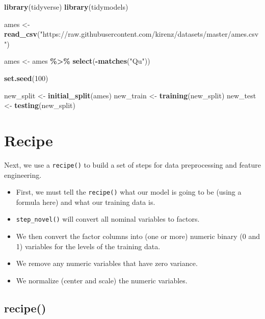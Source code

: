 \documentclass[
]{book}
\newenvironment{Shaded}{\begin{snugshade}}{\end{snugshade}}
\newcommand{\DecValTok}[1]{\textcolor[rgb]{0.00,0.00,0.81}{#1}}
\newcommand{\KeywordTok}[1]{\textcolor[rgb]{0.13,0.29,0.53}{\textbf{#1}}}
\newcommand{\NormalTok}[1]{#1}
\newcommand{\OperatorTok}[1]{\textcolor[rgb]{0.81,0.36,0.00}{\textbf{#1}}}
\newcommand{\StringTok}[1]{\textcolor[rgb]{0.31,0.60,0.02}{#1}}
\providecommand{\tightlist}{%
  \setlength{\itemsep}{0pt}\setlength{\parskip}{0pt}}
\begin{document}
\begin{Shaded}
\begin{Highlighting}[]
\KeywordTok{library}\NormalTok{(tidyverse)}
\KeywordTok{library}\NormalTok{(tidymodels)}

\NormalTok{ames \textless{}{-}}\StringTok{ }\KeywordTok{read\_csv}\NormalTok{(}\StringTok{"https://raw.githubusercontent.com/kirenz/datasets/master/ames.csv"}\NormalTok{)}

\NormalTok{ames \textless{}{-}}\StringTok{ }\NormalTok{ames }\OperatorTok{\%\textgreater{}\%}
\StringTok{  }\KeywordTok{select}\NormalTok{(}\OperatorTok{{-}}\KeywordTok{matches}\NormalTok{(}\StringTok{"Qu"}\NormalTok{))}

\KeywordTok{set.seed}\NormalTok{(}\DecValTok{100}\NormalTok{)}

\NormalTok{new\_split \textless{}{-}}\StringTok{ }\KeywordTok{initial\_split}\NormalTok{(ames)}
\NormalTok{new\_train \textless{}{-}}\StringTok{ }\KeywordTok{training}\NormalTok{(new\_split)}
\NormalTok{new\_test \textless{}{-}}\StringTok{ }\KeywordTok{testing}\NormalTok{(new\_split)}
\end{Highlighting}
\end{Shaded}

\hypertarget{recipe}{%
\chapter{Recipe}\label{recipe}}

Next, we use a \texttt{recipe()} to build a set of steps for data preprocessing and feature engineering.

\begin{itemize}
\tightlist
\item
  First, we must tell the \texttt{recipe()} what our model is going to be (using a formula here) and what our training data is.
\item
  \texttt{step\_novel()} will convert all nominal variables to factors.
\item
  We then convert the factor columns into (one or more) numeric binary (0 and 1) variables for the levels of the training data.
\item
  We remove any numeric variables that have zero variance.
\item
  We normalize (center and scale) the numeric variables.
\end{itemize}

\hypertarget{recipe-1}{%
\section{recipe()}\label{recipe-1}}
\end{document}
